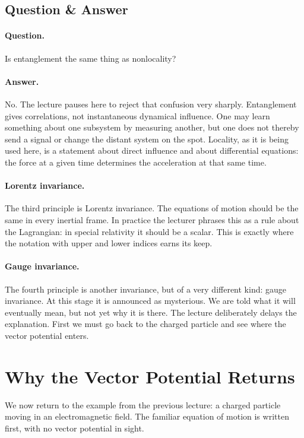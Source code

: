 \subsection{Question \& Answer}

\paragraph{Question.}
Is entanglement the same thing as nonlocality?

\paragraph{Answer.}
No. The lecture pauses here to reject that confusion very sharply. Entanglement gives correlations, not instantaneous dynamical influence. One may learn something about one subsystem by measuring another, but one does not thereby send a signal or change the distant system on the spot. Locality, as it is being used here, is a statement about direct influence and about differential equations: the force at a given time determines the acceleration at that same time.

\paragraph{Lorentz invariance.}
The third principle is Lorentz invariance. The equations of motion should be the same in every inertial frame. In practice the lecturer phrases this as a rule about the Lagrangian: in special relativity it should be a scalar. This is exactly where the notation with upper and lower indices earns its keep.

\paragraph{Gauge invariance.}
The fourth principle is another invariance, but of a very different kind: gauge invariance. At this stage it is announced as mysterious. We are told what it will eventually mean, but not yet why it is there. The lecture deliberately delays the explanation. First we must go back to the charged particle and see where the vector potential enters.

\section{Why the Vector Potential Returns}

We now return to the example from the previous lecture: a charged particle moving in an electromagnetic field. The familiar equation of motion is written first, with no vector potential in sight.

